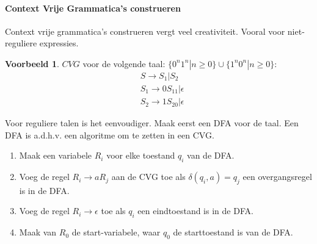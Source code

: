 \documentclass[12pt,a4paper]{article}
\theoremstyle{definition}
\newtheorem{vb}{Voorbeeld}[section]
\begin{document}
\paragraph{Context Vrije Grammatica's construeren}
Context vrije grammatica's construeren vergt veel creativiteit. Vooral voor niet-reguliere expressies.
\begin{vb}
$CVG$ voor de volgende taal: $\{0^n1^n|n\geq0\} \cup \{1^n0^n|n\geq 0\}$:\\
\begin{align*}
&S \rightarrow S_1|S_2\\
&S_1 \rightarrow 0S_11 | \epsilon\\
&S_2 \rightarrow 1S_20 | \epsilon
\end{align*}
\end{vb}
Voor reguliere talen is het eenvoudiger. Maak eerst een DFA voor de taal. Een DFA is a.d.h.v. een algoritme om te zetten in een CVG.
\begin{enumerate}
\item Maak een variabele $R_i$ voor elke toestand $q_i$ van de DFA.
\item Voeg de regel $R_i \rightarrow aR_j$ aan de CVG toe als $\delta (q_i,a) = q_j$ een overgangsregel is in de DFA.
\item Voeg de regel $R_i \rightarrow \epsilon$ toe als $q_i$ een eindtoestand is in de DFA.
\item Maak van $R_0$ de start-variabele, waar $q_0$ de starttoestand is van de DFA.
\end{enumerate}
\end{document}
